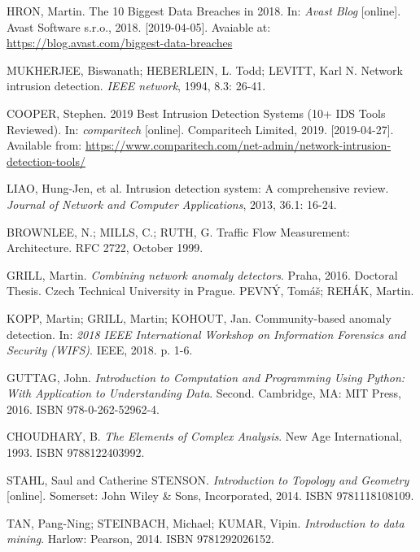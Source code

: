 \documentclass[thesis=B,english]{FITthesis}[2012/10/20]
\begin{document}
%
\begin{thebibliography}{99}
HRON, Martin. The 10 Biggest Data Breaches in 2018. In: \textit{Avast Blog} [online]. Avast Software s.r.o., 2018. [2019-04-05]. Avaiable at: \url{https://blog.avast.com/biggest-data-breaches}

MUKHERJEE, Biswanath; HEBERLEIN, L. Todd; LEVITT, Karl N. Network intrusion detection. \textit{IEEE network}, 1994, 8.3: 26-41.

COOPER, Stephen. 2019 Best Intrusion Detection Systems (10+ IDS Tools Reviewed). In: \textit{comparitech} [online]. Comparitech Limited, 2019. [2019-04-27]. Available from: \url{https://www.comparitech.com/net-admin/network-intrusion-detection-tools/}

LIAO, Hung-Jen, et al. Intrusion detection system: A comprehensive review. \textit{Journal of Network and Computer Applications}, 2013, 36.1: 16-24.

BROWNLEE, N.; MILLS, C.; RUTH, G. Traffic Flow Measurement: Architecture. RFC 2722, October 1999.

GRILL, Martin. \textit{Combining network anomaly detectors}. Praha, 2016. Doctoral Thesis. Czech Technical University in Prague. PEVNÝ, Tomáš; REHÁK, Martin.

KOPP, Martin; GRILL, Martin; KOHOUT, Jan. Community-based anomaly detection. In: \textit{2018 IEEE International Workshop on Information Forensics and Security (WIFS)}. IEEE, 2018. p. 1-6.

GUTTAG, John. \textit{Introduction to Computation and Programming Using Python: With Application to Understanding Data}. Second. Cambridge, MA: MIT Press, 2016. ISBN 978-0-262-52962-4.

CHOUDHARY, B. \textit{The Elements of Complex Analysis}. New Age International, 1993. ISBN 9788122403992.

STAHL, Saul and Catherine STENSON. \textit{Introduction to Topology and Geometry} [online]. Somerset: John Wiley \& Sons, Incorporated, 2014. ISBN 9781118108109.

TAN, Pang-Ning; STEINBACH, Michael; KUMAR, Vipin. \textit{Introduction to data mining}. Harlow: Pearson, 2014. ISBN 9781292026152.


\end{thebibliography}
\end{document}
